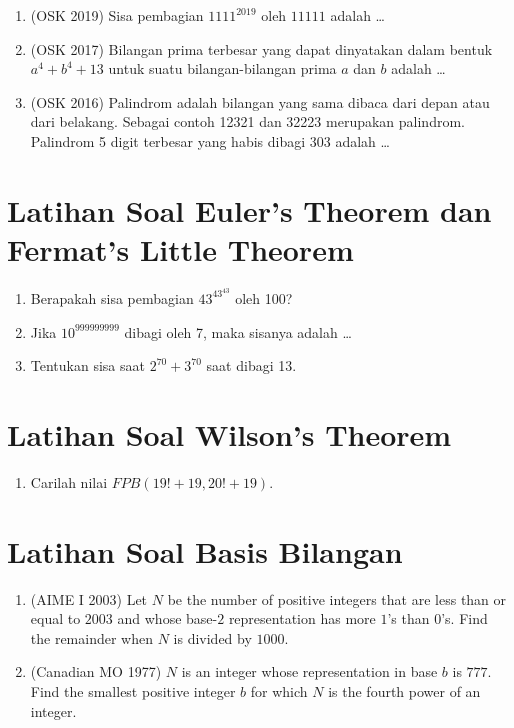 \documentclass[12pt, letter]{scrartcl}
\begin{document}
\begin{enumerate}
    \item (OSK 2019) Sisa pembagian $1111^{2019}$ oleh $11111$ adalah \ldots

    \item (OSK 2017) Bilangan prima terbesar yang dapat dinyatakan dalam bentuk $a^4+b^4+13$ untuk suatu bilangan-bilangan prima $a$ dan $b$ adalah \ldots

    \item (OSK 2016) Palindrom adalah bilangan yang sama dibaca dari depan atau dari belakang. Sebagai contoh 12321 dan 32223 merupakan palindrom. Palindrom 5 digit terbesar yang habis dibagi 303 adalah \ldots
\end{enumerate}

\section{Latihan Soal Euler's Theorem dan Fermat's Little Theorem}
\begin{enumerate}
    \item Berapakah sisa pembagian $43^{43^{43}}$ oleh 100?
    
    \item Jika $10^{999999999}$ dibagi oleh 7, maka sisanya adalah \dots
    
    \item Tentukan sisa saat $2^{70}+3^{70}$ saat dibagi 13.
\end{enumerate}

\section{Latihan Soal Wilson's Theorem}
\begin{enumerate}
    \item Carilah nilai $FPB(19!+19,20!+19).$
\end{enumerate}



\section{Latihan Soal Basis Bilangan}
\begin{enumerate}
    \item (AIME I 2003) Let $N$ be the number of positive integers that are less than or equal to $2003$ and whose base-$2$ representation has more $1$'s than $0$'s. Find the remainder when $N$ is divided by $1000$.

    \item (Canadian MO 1977) $N$ is an integer whose representation in base $b$ is $777.$ Find the smallest positive integer $b$ for which $N$ is the fourth power of an integer.
\end{enumerate}
\end{document}
